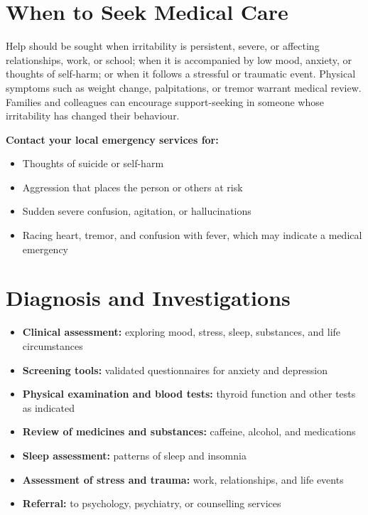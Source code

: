 \section*{When to Seek Medical Care}
Help should be sought when irritability is persistent, severe, or affecting relationships, work, or school; when it is accompanied by low mood, anxiety, or thoughts of self-harm; or when it follows a stressful or traumatic event. Physical symptoms such as weight change, palpitations, or tremor warrant medical review. Families and colleagues can encourage support-seeking in someone whose irritability has changed their behaviour.

\textbf{Contact your local emergency services for:}
\begin{itemize}
    \item Thoughts of suicide or self-harm
    \item Aggression that places the person or others at risk
    \item Sudden severe confusion, agitation, or hallucinations
    \item Racing heart, tremor, and confusion with fever, which may indicate a medical emergency
\end{itemize}

\section*{Diagnosis and Investigations}
\begin{itemize}
    \item \textbf{Clinical assessment:} exploring mood, stress, sleep, substances, and life circumstances
    \item \textbf{Screening tools:} validated questionnaires for anxiety and depression
    \item \textbf{Physical examination and blood tests:} thyroid function and other tests as indicated
    \item \textbf{Review of medicines and substances:} caffeine, alcohol, and medications
    \item \textbf{Sleep assessment:} patterns of sleep and insomnia
    \item \textbf{Assessment of stress and trauma:} work, relationships, and life events
    \item \textbf{Referral:} to psychology, psychiatry, or counselling services
\end{itemize}

